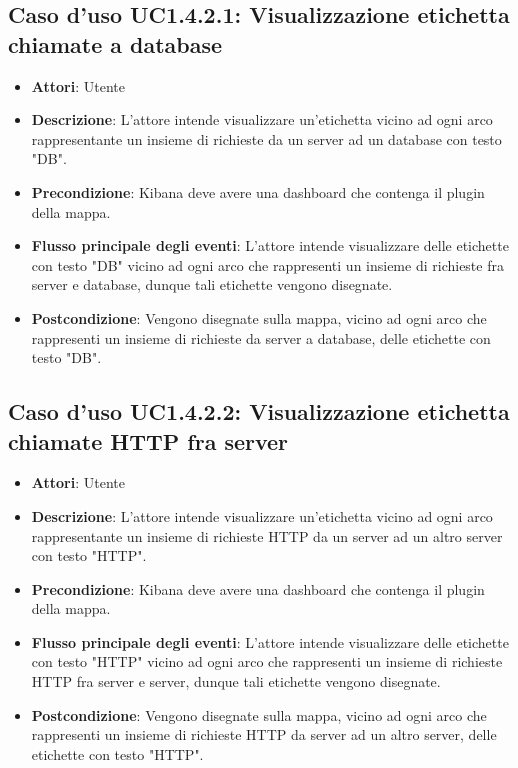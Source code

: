 \subsection{Caso d'uso UC1.4.2.1: Visualizzazione etichetta chiamate a database}
\begin{itemize}
\item \textbf{Attori}: Utente
\item \textbf{Descrizione}: L'attore intende visualizzare un'etichetta vicino ad ogni arco rappresentante un insieme di richieste da un server ad un database con testo "DB".
\item \textbf{Precondizione}: Kibana deve avere una dashboard che contenga il plugin della mappa.
\item \textbf{Flusso principale degli eventi}: L'attore intende visualizzare delle etichette con testo "DB" vicino ad ogni arco che rappresenti un insieme di richieste fra server e database, dunque tali etichette vengono disegnate.
\item \textbf{Postcondizione}: Vengono disegnate sulla mappa, vicino ad ogni arco che rappresenti un insieme di richieste da server a database, delle etichette con testo "DB".
\end{itemize}
\subsection{Caso d'uso UC1.4.2.2: Visualizzazione etichetta chiamate HTTP fra server}
\begin{itemize}
\item \textbf{Attori}: Utente
\item \textbf{Descrizione}: L'attore intende visualizzare un'etichetta vicino ad ogni arco rappresentante un insieme di richieste HTTP da un server ad un altro server con testo "HTTP".
\item \textbf{Precondizione}: Kibana deve avere una dashboard che contenga il plugin della mappa.
\item \textbf{Flusso principale degli eventi}: L'attore intende visualizzare delle etichette con testo "HTTP" vicino ad ogni arco che rappresenti un insieme di richieste HTTP fra server e server, dunque tali etichette vengono disegnate.
\item \textbf{Postcondizione}: Vengono disegnate sulla mappa, vicino ad ogni arco che rappresenti un insieme di richieste HTTP da server ad un altro server, delle etichette con testo "HTTP".
\end{itemize}
